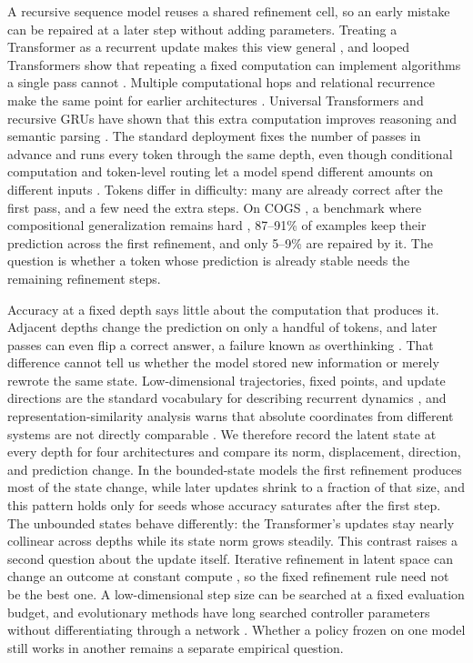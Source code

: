 \documentclass[11pt]{article}
\begin{document}
A recursive sequence model reuses a shared refinement cell, so an early mistake can be repaired at a later step without adding parameters. Treating a Transformer as a recurrent update makes this view general \citep{katharopoulos2020transformers}, and looped Transformers show that repeating a fixed computation can implement algorithms a single pass cannot \citep{giannou2023looped,yang2024looped}. Multiple computational hops and relational recurrence make the same point for earlier architectures \citep{sukhbaatar2015memory,santoro2018relational}. Universal Transformers and recursive GRUs have shown that this extra computation improves reasoning and semantic parsing \citep{dehghani2019universal,graves2016adaptive}. The standard deployment fixes the number of passes in advance and runs every token through the same depth, even though conditional computation and token-level routing let a model spend different amounts on different inputs \citep{fedus2022switch,raposo2024mixture}. Tokens differ in difficulty: many are already correct after the first pass, and a few need the extra steps. On COGS \citep{kim2020cogs}, a benchmark where compositional generalization remains hard \citep{lake2018generalization,oren2020improving}, 87--91\% of examples keep their prediction across the first refinement, and only 5--9\% are repaired by it. The question is whether a token whose prediction is already stable needs the remaining refinement steps.

Accuracy at a fixed depth says little about the computation that produces it. Adjacent depths change the prediction on only a handful of tokens, and later passes can even flip a correct answer, a failure known as overthinking \citep{kaya2019shallowdeep}. That difference cannot tell us whether the model stored new information or merely rewrote the same state. Low-dimensional trajectories, fixed points, and update directions are the standard vocabulary for describing recurrent dynamics \citep{sussillo2013blackbox,vyas2020population,haviv2019memory}, and representation-similarity analysis warns that absolute coordinates from different systems are not directly comparable \citep{kriegeskorte2008rsa,kornblith2019cka}. We therefore record the latent state at every depth for four architectures and compare its norm, displacement, direction, and prediction change. In the bounded-state models the first refinement produces most of the state change, while later updates shrink to a fraction of that size, and this pattern holds only for seeds whose accuracy saturates after the first step. The unbounded states behave differently: the Transformer's updates stay nearly collinear across depths while its state norm grows steadily. This contrast raises a second question about the update itself. Iterative refinement in latent space can change an outcome at constant compute \citep{lee2020iterative,geng2021rewrite}, so the fixed refinement rule need not be the best one. A low-dimensional step size can be searched at a fixed evaluation budget, and evolutionary methods have long searched controller parameters without differentiating through a network \citep{stanley2002neat,such2017neuro}. Whether a policy frozen on one model still works in another remains a separate empirical question.
\end{document}
